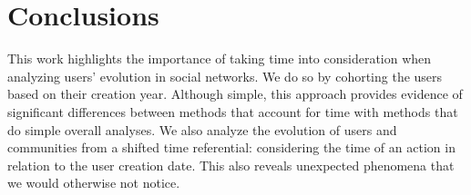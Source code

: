 

%

\section{Conclusions}

This work highlights the importance of taking time into consideration when analyzing users' evolution in social networks. We do so by cohorting the users based on their creation year. Although simple, this approach provides evidence of significant differences between methods that account for time with methods that do simple overall analyses.  We also analyze the evolution of users and communities from a shifted time referential: considering the time of an action in relation to the user creation date. This also reveals unexpected phenomena that we would otherwise not notice.

